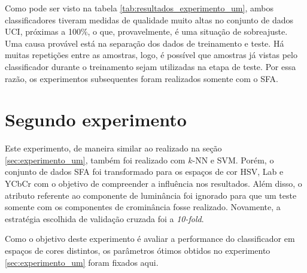 Como pode ser visto na tabela \ref{tab:resultados_experimento_um}, ambos classificadores tiveram medidas de qualidade muito altas no conjunto de dados UCI, próximas a 100\%, o que, provavelmente, é uma situação de sobreajuste. Uma causa provável está na separação dos dados de treinamento e teste. Há muitas repetições entre as amostras, logo, é possível que amostras já vistas pelo classificador durante o treinamento sejam utilizadas na etapa de teste. Por essa razão, os experimentos subsequentes foram realizados somente com o SFA.

\section{Segundo experimento}
\label{sec:experimento_dois}
Este experimento, de maneira similar ao realizado na seção \ref{sec:experimento_um}, também foi realizado com $k$-NN e SVM. Porém, o conjunto de dados SFA foi transformado para os espaços de cor HSV, Lab e YCbCr com o objetivo de compreender a influência nos resultados. Além disso, o atributo referente ao componente de luminância foi ignorado para que um teste somente com os componentes de crominância fosse realizado. Novamente, a estratégia escolhida de validação cruzada foi a \emph{10-fold}.

Como o objetivo deste experimento é avaliar a performance do classificador em espaços de cores distintos, os parâmetros ótimos obtidos no experimento \ref{sec:experimento_um} foram fixados aqui.

